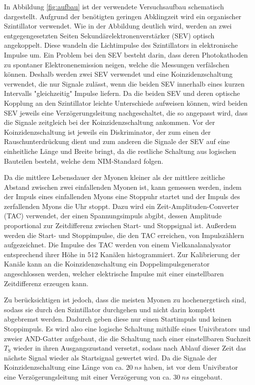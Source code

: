 In Abbildung \ref{fig:aufbau} ist der verwendete Versuchsaufbau schematisch dargestellt. Aufgrund der benötigten geringen Abklingzeit wird ein organischer Szintillator
verwendet. Wie in der Abbildung deutlich wird, werden an zwei entgegengesetzten Seiten Sekundärelektronenverstärker (SEV) optisch angekoppelt. Diese wandeln die Lichtimpulse
des Szintillators in elektronische Impulse um. Ein Problem bei den SEV besteht darin, dass deren Photokathoden zu spontaner Elektronenemission neigen, welche die Messungen
verfälschen können. Deshalb werden zwei SEV verwendet und eine Koinzidenzschaltung verwendet, die nur Signale zulässt, wenn die beiden SEV innerhalb eines kurzen Intervalls "gleichzeitig"
Impulse liefern. Da die beiden SEV und deren optische Kopplung an den Szintillator leichte Unterschiede aufweisen können, wird beiden SEV jeweils eine Verzögerungsleitung nachgeschaltet, die
so angepasst wird, dass die Signale zeitgleich bei der Koinzidenzschaltung ankommen. Vor der Koinzidenzschaltung ist jeweils ein Diskriminator, der zum einen der Rauschunterdrückung dient
und zum anderen die Signale der SEV auf eine einheitliche Länge und Breite bringt, da die restliche Schaltung aus logischen Bauteilen besteht, welche dem NIM-Standard folgen.

Da die mittlere Lebensdauer der Myonen kleiner als der mittlere zeitliche Abstand zwischen zwei einfallenden Myonen ist, kann gemessen werden, indem der Impuls eines einfallenden Myons eine
Stoppuhr startet und der Impuls des zerfallenden Myons die Uhr stoppt. Dazu wird ein Zeit-Amplituden-Converter (TAC) verwendet, der einen Spannungsimpuls abgibt, dessen Amplitude proportional
zur Zeitdifferenz zwischen Start- und Stoppsignal ist. Außerdem werden die Start- und Stoppimpulse, die den TAC erreichen, von Impulszählern aufgezeichnet. Die Impulse des TAC werden von einem
Vielkanalanalysator entsprechend ihrer Höhe in 512 Kanälen histogrammiert. Zur Kalibrierung der Kanäle kann an die Koinzidenzschaltung ein Doppelimpulsgenerator angeschlossen werden, welcher
elektrische Impulse mit einer einstellbaren Zeitdifferenz erzeugen kann.

Zu berücksichtigen ist jedoch, dass die meisten Myonen zu hochenergetisch sind, sodass sie durch den Szintillator durchgehen und nicht darin komplett abgebremst werden. Dadurch geben diese
nur einen Startimpuls und keinen Stoppimpuls. Es wird also eine logische Schaltung mithilfe eines Univibrators und zweier AND-Gatter aufgebaut, die die Schaltung nach einer einstellbaren
Suchzeit $T_\text{S}$ wieder in ihren Ausgangszustand versetzt, sodass nach Ablauf dieser Zeit das nächste Signal wieder als Startsignal gewertet wird. Da die Signale der Koinzidenzschaltung
eine Länge von ca. $\SI{20}{ns}$ haben, ist vor dem Univibrator eine Verzögerungsleitung mit einer Verzögerung von ca. $\SI{30}{ns}$ eingebaut.

